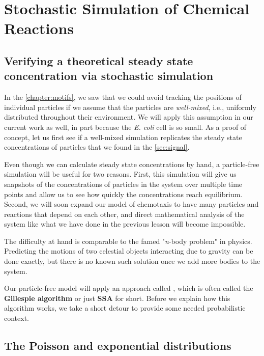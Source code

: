 \FloatBarrier
{}

\section{Stochastic Simulation of Chemical Reactions}
\label{sec:stochastic_simulation_of_chemical_reactions}
\subsection{Verifying a theoretical steady state concentration via stochastic simulation}

In the \autoref{chapter:motifs}, we saw that we could avoid tracking the positions of individual particles if we assume that the particles are \textit{well-mixed}, i.e., uniformly distributed throughout their environment. We will apply this assumption in our current work as well, in part because the \textit{E. coli} cell is so small. As a proof of concept, let us first see if a well-mixed simulation replicates the steady state concentrations of particles that we found in the \autoref{sec:signal}.

Even though we can calculate steady state concentrations by hand, a particle-free simulation will be useful for two reasons. First, this simulation will give us snapshots of the concentrations of particles in the system over multiple time points and allow us to see how quickly the concentrations reach equilibrium. Second, we will soon expand our model of chemotaxis to have many particles and reactions that depend on each other, and direct mathematical analysis of the system like what we have done in the previous lesson will become impossible.

The difficulty at hand is comparable to the famed "\textit{n}-body problem" in physics. Predicting the motions of two celestial objects interacting due to gravity can be done exactly, but there is no known such solution once we add more bodies to the system.

Our particle-free model will apply an approach called , which is often called the \textbf{Gillespie algorithm} or just \textbf{SSA} for short. Before we explain how this algorithm works, we take a short detour to provide some needed probabilistic context.

\FloatBarrier
{}
\subsection{The Poisson and exponential distributions}


